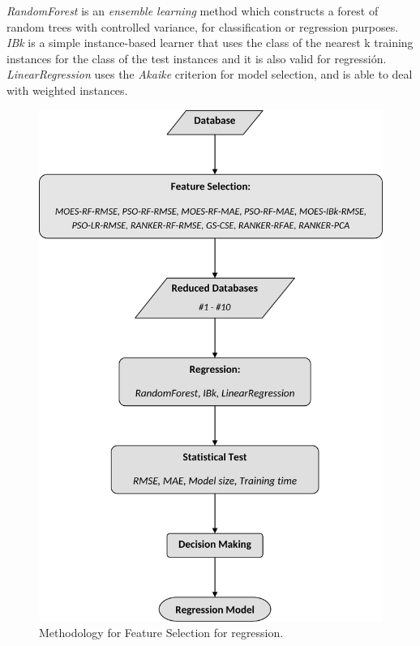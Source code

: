 \documentclass[journal,twoside,web]{ieeecolor}
\begin{document}
{\em RandomForest} is an \emph{ensemble learning} method which constructs a forest of random trees with controlled variance, for classification or regression purposes. {\em IBk} is a simple instance-based learner that uses the class of the nearest k training instances for the class of the test instances and it is also valid for regressión. \textit{LinearRegression} uses the \textit{Akaike} criterion for model selection, and is able to deal with weighted instances.

\begin{figure}[h!]
	
	\begin{center}
		\includegraphics[scale=0.55]{./figs/metodology-i.pdf}
		\caption{Methodology for Feature Selection for regression.}
		\label{fig:grafico-metod} 
	\end{center}
\end{figure}
\end{document}
